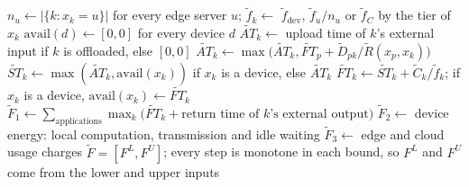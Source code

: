 \begin{algorithm}[!htbp]
\caption{\textsc{Evaluate}: interval critical-path calculus for one solution $(\mathbf{x}, \mathbf{o})$}
\label{alg:eval}
\begin{algorithmic}[1]
\State $n_u \gets |\{k : x_k = u\}|$ for every edge server $u$; \; $\tilde{f}_k \gets$ $\tilde{f}_{\mathrm{dev}}$, $\tilde{f}_u / n_u$ or $\tilde{f}_C$ by the tier of $x_k$
\State $\mathrm{avail}(d) \gets [0, 0]$ for every device $d$ 
  \State $\widetilde{AT}_k \gets$ upload time of $k$'s external input if $k$ is offloaded, else $[0, 0]$
    \State $\widetilde{AT}_k \gets \max\big(\widetilde{AT}_k, \widetilde{FT}_p + \tilde{D}_{pk} / \tilde{R}(x_p, x_k)\big)$ 
  \EndFor
  \State $\widetilde{ST}_k \gets \max(\widetilde{AT}_k, \mathrm{avail}(x_k))$ if $x_k$ is a device, else $\widetilde{AT}_k$
  \State $\widetilde{FT}_k \gets \widetilde{ST}_k + \tilde{C}_k / \tilde{f}_k$; \; if $x_k$ is a device, $\mathrm{avail}(x_k) \gets \widetilde{FT}_k$
\EndFor
\State $\tilde{F}_1 \gets \sum_{\text{applications}} \max_{k} \big(\widetilde{FT}_k + \text{return time of $k$'s external output}\big)$ 
\State $\tilde{F}_2 \gets$ device energy: local computation, transmission and idle waiting 
\State $\tilde{F}_3 \gets$ edge and cloud usage charges 
\State \Return $\tilde{F} = [F^L, F^U]$; every step is monotone in each bound, so $F^L$ and $F^U$ come from the lower and upper inputs
\end{algorithmic}
\end{algorithm}
